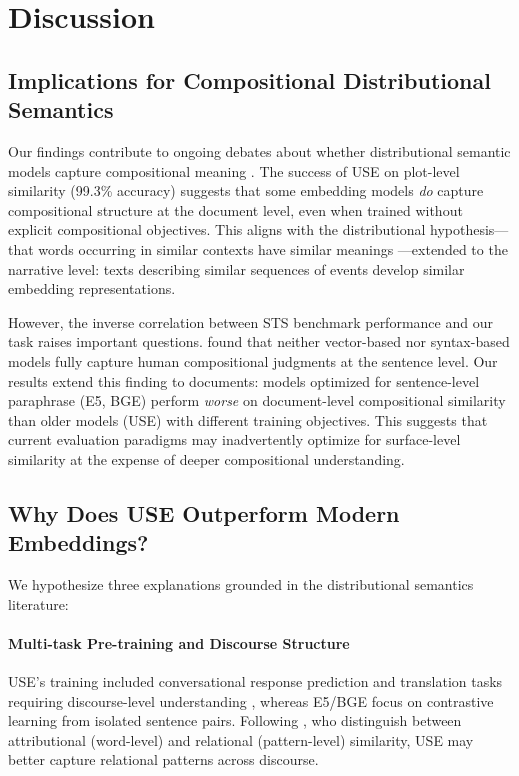 \documentclass[11pt]{article}
\begin{document}
\section{Discussion}

\subsection{Implications for Compositional Distributional Semantics}

Our findings contribute to ongoing debates about whether distributional semantic models capture compositional meaning \cite{Baroni2014Compositional,Boleda2020Distributional}. The success of USE on plot-level similarity (99.3\% accuracy) suggests that some embedding models \textit{do} capture compositional structure at the document level, even when trained without explicit compositional objectives. This aligns with the distributional hypothesis---that words occurring in similar contexts have similar meanings \cite{Harris1954,Firth1957}---extended to the narrative level: texts describing similar sequences of events develop similar embedding representations.

However, the inverse correlation between STS benchmark performance and our task raises important questions. \citet{Fodor2025Compositionality} found that neither vector-based nor syntax-based models fully capture human compositional judgments at the sentence level. Our results extend this finding to documents: models optimized for sentence-level paraphrase (E5, BGE) perform \textit{worse} on document-level compositional similarity than older models (USE) with different training objectives. This suggests that current evaluation paradigms may inadvertently optimize for surface-level similarity at the expense of deeper compositional understanding.

\subsection{Why Does USE Outperform Modern Embeddings?}

We hypothesize three explanations grounded in the distributional semantics literature:

\paragraph{Multi-task Pre-training and Discourse Structure} USE's training included conversational response prediction and translation tasks requiring discourse-level understanding \cite{Cer2018}, whereas E5/BGE focus on contrastive learning from isolated sentence pairs. Following \citet{Turney2010VSM}, who distinguish between attributional (word-level) and relational (pattern-level) similarity, USE may better capture relational patterns across discourse.
\end{document}
